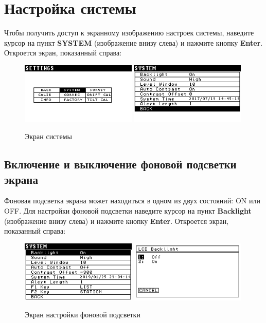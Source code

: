 \section{Настройка системы}

Чтобы получить доступ к экранному изображению настроек системы, наведите курсор
на пункт \textbf{SYSTEM} (изображение внизу слева) и нажмите кнопку
\textbf{Enter}.  Откроется экран, показанный справа:

\begin{figure}[H]
  \centering
  \includegraphics[width=0.49\textwidth]{figures/the_system_screen_1}
  \includegraphics[width=0.49\textwidth]{figures/the_system_screen_2}
  \caption{Экран системы}
  \label{fig:the_system_screen}
\end{figure}

\subsection{Включение и выключение фоновой подсветки экрана}

Фоновая подсветка экрана может находиться в одном из двух состояний: ON или OFF.
Для настройки фоновой подсветки наведите курсор на пункт \textbf{Backlight}
(изображение внизу слева) и нажмите кнопку \textbf{Enter}. Откроется экран,
показанный справа:

\newpage
\begin{figure}[H]
  \centering
  \includegraphics[width=0.49\textwidth]{figures/the_backlight_screen_1}
  \includegraphics[width=0.49\textwidth]{figures/the_backlight_screen_2}
  \caption{Экран настройки фоновой подсветки}
  \label{fig:the_backlight_screen}
\end{figure}

